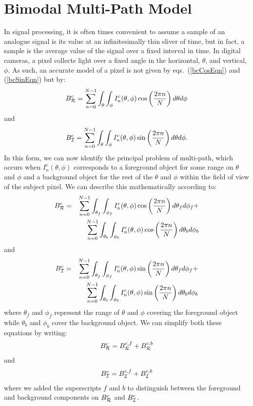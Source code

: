 \documentclass[10pt]{article}
\begin{document}
\section{Bimodal Multi-Path Model}
\noindent In signal processing, it is often times convenient to assume a sample of an analogue signal is its value at an infinitesimally thin sliver of time, but in fact, a sample is the average value of the signal over a fixed interval in time.  In digital cameras, a pixel collects light over a fixed angle in the horizontal, $\theta$, and vertical, $\phi$.  As such, an accurate model of a pixel is not given by eqs.~(\ref{bcCosEqn}) and (\ref{bcSinEqn}) but by:
\begin{equation}
    B^c_{\cal R}  =  \sum_{n=0}^{N-1} \int_{\theta}\int_{\phi} I_n^c(\theta, \phi) 
    			    \cos\left(\frac{2\pi n}{N}\right) d\theta d\phi
\end{equation}
and
\begin{equation}
    B^c_{\cal I}  = \sum_{n=0}^{N-1} \int_{\theta}\int_{\phi} I_n^c(\theta, \phi) 
    		          \sin\left(\frac{2\pi n}{N}\right) d\theta d\phi.
\end{equation}
In this form, we can now identify the principal problem of multi-path, which occurs when $I_n^c(\theta, \phi)$ corresponds to a foreground object for some range on $\theta$ and $\phi$ and a background object for the rest of the $\theta$ and $\phi$ within the field of view of the subject pixel. We can describe this mathematically according to:
\begin{eqnarray}
    B^c_{\cal R}  & = & \sum_{n=0}^{N-1} \int_{\theta_f}\int_{\phi_f} I_n^c(\theta, \phi) 
    			    \cos\left(\frac{2\pi n}{N}\right) d\theta_f d\phi_f + 					\nonumber \\
& &			     \sum_{n=0}^{N-1} \int_{\theta_b}\int_{\phi_b} I_n^c(\theta, \phi) 
    			    \cos\left(\frac{2\pi n}{N}\right) d\theta_b d\phi_b
\end{eqnarray}
and
\begin{eqnarray}
    B^c_{\cal I}  & = &  \sum_{n=0}^{N-1} \int_{\theta_f}\int_{\phi_f} I_n^c(\theta, \phi) 
    			    \sin\left(\frac{2\pi n}{N}\right) d\theta_f d\phi_f +     					\nonumber \\
& &			     \sum_{n=0}^{N-1} \int_{\theta_b}\int_{\phi_b} I_n^c(\theta, \phi) 
    			    \sin\left(\frac{2\pi n}{N}\right) d\theta_b d\phi_b
\end{eqnarray}
where $\theta_f$ and $\phi_f$ represent the range of $\theta$ and $\phi$ covering the foreground object while $\theta_b$ and $\phi_b$ cover the background object. We can simplify both these equations by writing:
\begin{equation}
    B^c_{\cal R}  =  B^{c,f}_{\cal R} + B^{c,b}_{\cal R}
\end{equation}
and
\begin{equation}
    B^c_{\cal I}  =  B^{c,f}_{\cal I} + B^{c,b}_{\cal I}
\end{equation}
where we added the superscripts $f$ and $b$ to distinguish between the foreground and background components on $B^c_{\cal R}$ and $B^c_{\cal I}$. 
\end{document}
